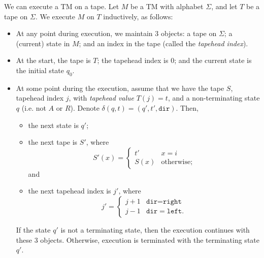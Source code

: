 We can execute a TM on a tape. Let $M$ be a TM with alphabet $\Sigma$, and let $T$ be a tape on $\Sigma$. We execute $M$ on $T$ inductively, as follows:
\begin{itemize}
    \item At any point during execution, we maintain 3 objects: a tape on $\Sigma$; a (current) state in $M$; and an index in the tape (called the \emph{tapehead index}).  

    \item At the start, the tape is $T$; the tapehead index is $0$; and the current state is the initial state $q_0$. 
    
    \item At some point during the execution, assume that we have the tape $S$, tapehead index $j$, with \emph{tapehead value} $T(j) = t$, and a non-terminating state $q$ (i.e. not $A$ or $R$). Denote $\delta(q, t) = (q', t', \texttt{dir})$. Then, 
    \begin{itemize}
        \item the next state is $q'$;
        \item the next tape is $S'$, where
        \[S'(x) = \begin{cases}
            t' & x = i \\
            S(x) & \text{otherwise};
        \end{cases}\]
        and
        \item the next tapehead index is $j'$, where
        \[j' = \begin{cases}
            j+1 & \texttt{dir} = \texttt{right} \\
            j-1 & \texttt{dir} = \texttt{left}.
        \end{cases}\]
    \end{itemize}
    If the state $q'$ is not a terminating state, then the execution continues with these 3 objects. Otherwise, execution is terminated with the terminating state $q'$.
\end{itemize}

